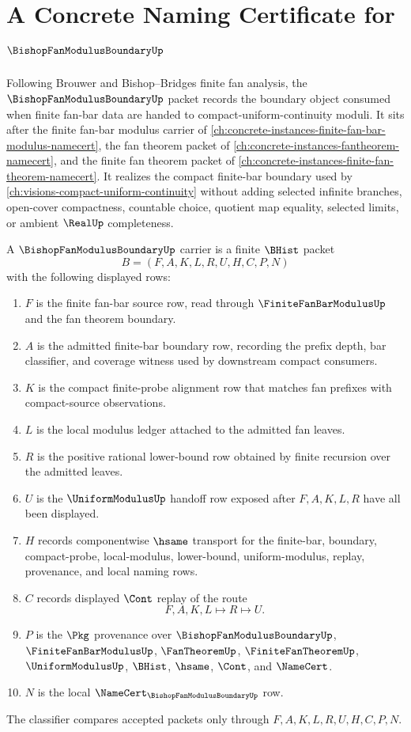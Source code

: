 \chapter{A Concrete Naming Certificate for $\BishopFanModulusBoundaryUp$}
\label{ch:concrete-instances-bishop-fan-modulus-boundary-namecert}

Following Brouwer and Bishop--Bridges finite fan analysis, the $\BishopFanModulusBoundaryUp$ packet records the boundary object consumed when finite fan-bar data are handed to compact-uniform-continuity moduli. It sits after the finite fan-bar modulus carrier of \autoref{ch:concrete-instances-finite-fan-bar-modulus-namecert}, the fan theorem packet of \autoref{ch:concrete-instances-fantheorem-namecert}, and the finite fan theorem packet of \autoref{ch:concrete-instances-finite-fan-theorem-namecert}. It realizes the compact finite-bar boundary used by \autoref{ch:visions-compact-uniform-continuity} without adding selected infinite branches, open-cover compactness, countable choice, quotient map equality, selected limits, or ambient $\RealUp$ completeness.

\begin{definition}
\label{def:bishop-fan-modulus-boundary-carrier}
A $\BishopFanModulusBoundaryUp$ carrier is a finite $\BHist$ packet
$$
B=(F,A,K,L,R,U,H,C,P,N)
$$
with the following displayed rows:
\begin{enumerate}
\item $F$ is the finite fan-bar source row, read through $\FiniteFanBarModulusUp$ and the fan theorem boundary.
\item $A$ is the admitted finite-bar boundary row, recording the prefix depth, bar classifier, and coverage witness used by downstream compact consumers.
\item $K$ is the compact finite-probe alignment row that matches fan prefixes with compact-source observations.
\item $L$ is the local modulus ledger attached to the admitted fan leaves.
\item $R$ is the positive rational lower-bound row obtained by finite recursion over the admitted leaves.
\item $U$ is the $\UniformModulusUp$ handoff row exposed after $F,A,K,L,R$ have all been displayed.
\item $H$ records componentwise $\hsame$ transport for the finite-bar, boundary, compact-probe, local-modulus, lower-bound, uniform-modulus, replay, provenance, and local naming rows.
\item $C$ records displayed $\Cont$ replay of the route
$$
F,A,K,L \longmapsto R \longmapsto U .
$$
\item $P$ is the $\Pkg$ provenance over $\BishopFanModulusBoundaryUp$, $\FiniteFanBarModulusUp$, $\FanTheoremUp$, $\FiniteFanTheoremUp$, $\UniformModulusUp$, $\BHist$, $\hsame$, $\Cont$, and $\NameCert$.
\item $N$ is the local $\NameCert_{\BishopFanModulusBoundaryUp}$ row.
\end{enumerate}
The classifier compares accepted packets only through $F,A,K,L,R,U,H,C,P,N$.
\end{definition}

